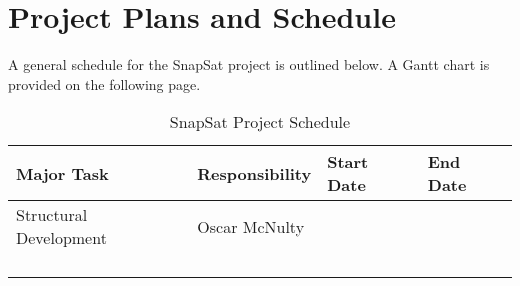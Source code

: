 \section{Project Plans and Schedule}
A general schedule for the SnapSat project is outlined below. A Gantt chart is provided on the following page.
\begin{table}[H]
    \centering
    \caption{SnapSat Project Schedule}
    \vspace{0.15cm}
    {\renewcommand{\arraystretch}{1.4}%
        \begin{tabular}{|>{\arraybackslash}m{3.5cm}|>{\arraybackslash}m{4cm}|>{\arraybackslash}m{3.2cm}|>{\arraybackslash}m{3.2cm}|}
            \hline
            \textbf{Major Task} & \textbf{Responsibility} & {\bf Start Date} & {\bf End Date} \\ \hline\hline
            Structural Development & Oscar McNulty & & \\\hline
             & & & \\\hline
             & & & \\\hline
             & & & \\\hline
             & & & \\\hline
        \end{tabular} } 
    \end{table}
    
